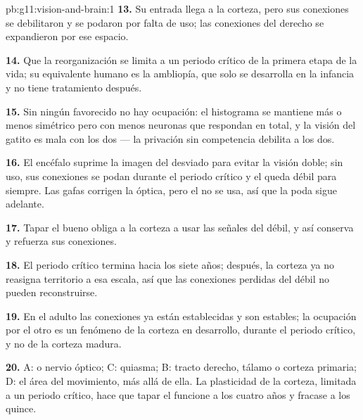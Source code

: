 \begin{solution}{pb:g11:vision-and-brain:1}
\textbf{13.} Su entrada llega a la corteza, pero sus conexiones se
debilitaron y se podaron por falta de uso; las conexiones del 
derecho se expandieron por ese espacio.

\textbf{14.} Que la reorganización se limita a un periodo crítico de la
primera etapa de la vida; su equivalente humano es la ambliopía, que
solo se desarrolla en la infancia y no tiene tratamiento después.

\textbf{15.} Sin ningún  favorecido no hay ocupación: el histograma
se mantiene más o menos simétrico pero con menos neuronas que
respondan en total, y la visión del gatito es mala con los dos  ---
la privación sin competencia debilita a los dos.

\textbf{16.} El encéfalo suprime la imagen del  desviado para evitar
la visión doble; sin uso, sus conexiones se podan durante el periodo
crítico y el  queda débil para siempre. Las gafas corrigen la
óptica, pero el  no se usa, así que la poda sigue adelante.

\textbf{17.} Tapar el  bueno obliga a la corteza a usar las señales
del  débil, y así conserva y refuerza sus conexiones.

\textbf{18.} El periodo crítico termina hacia los siete años; después,
la corteza ya no reasigna territorio a esa escala, así que las
conexiones perdidas del  débil no pueden reconstruirse.

\textbf{19.} En el adulto las conexiones ya están establecidas y son
estables; la ocupación por el otro  es un fenómeno de la corteza en
desarrollo, durante el periodo crítico, y no de la corteza madura.

\textbf{20.} A:  o nervio óptico; C: quiasma; B: tracto derecho,
tálamo o corteza primaria; D: el área del movimiento, más allá de ella.
La plasticidad de la corteza, limitada a un periodo crítico, hace que
tapar el  funcione a los cuatro años y fracase a los quince.
\end{solution}
